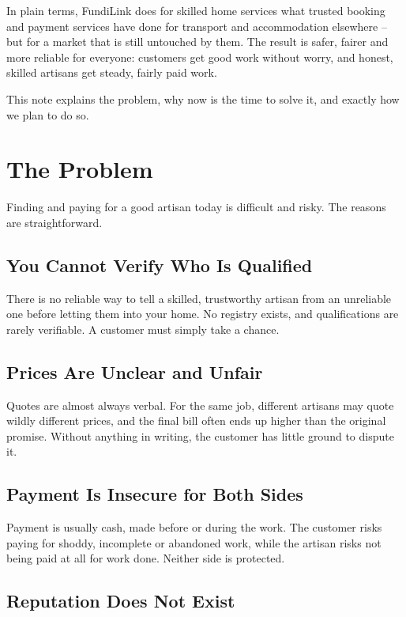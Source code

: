 \documentclass[11pt,a4paper]{article}
\begin{document}
In plain terms, FundiLink does for skilled home services what trusted booking and payment
services have done for transport and accommodation elsewhere -- but for a market that is still
untouched by them. The result is safer, fairer and more reliable for everyone: customers get
good work without worry, and honest, skilled artisans get steady, fairly paid work.

This note explains the problem, why now is the time to solve it, and exactly how we plan to
do so.

\section{The Problem}

Finding and paying for a good artisan today is difficult and risky. The reasons are
straightforward.

\subsection{You Cannot Verify Who Is Qualified}

There is no reliable way to tell a skilled, trustworthy artisan from an unreliable one before
letting them into your home. No registry exists, and qualifications are rarely verifiable. A
customer must simply take a chance.

\subsection{Prices Are Unclear and Unfair}

Quotes are almost always verbal. For the same job, different artisans may quote wildly
different prices, and the final bill often ends up higher than the original promise. Without
anything in writing, the customer has little ground to dispute it.

\subsection{Payment Is Insecure for Both Sides}

Payment is usually cash, made before or during the work. The customer risks paying for
shoddy, incomplete or abandoned work, while the artisan risks not being paid at all for work
done. Neither side is protected.

\subsection{Reputation Does Not Exist}
\end{document}
